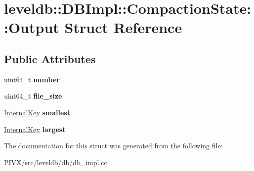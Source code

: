 \hypertarget{structleveldb_1_1_d_b_impl_1_1_compaction_state_1_1_output}{}\section{leveldb\+:\+:D\+B\+Impl\+:\+:Compaction\+State\+:\+:Output Struct Reference}
\label{structleveldb_1_1_d_b_impl_1_1_compaction_state_1_1_output}
\subsection*{Public Attributes}
\begin{DoxyCompactItemize}
\item 
\mbox{\label{structleveldb_1_1_d_b_impl_1_1_compaction_state_1_1_output_aa4b759dca2a83bdb8d9edbf7e2d213e2}} 
uint64\+\_\+t {\bfseries number}
\item 
\mbox{\label{structleveldb_1_1_d_b_impl_1_1_compaction_state_1_1_output_a37906cee65a9d1873b7b7a4169f22402}} 
uint64\+\_\+t {\bfseries file\+\_\+size}
\item 
\mbox{\label{structleveldb_1_1_d_b_impl_1_1_compaction_state_1_1_output_a88ada857d0cf32ae8e76d7baf4e80c69}} 
\mbox{\hyperlink{classleveldb_1_1_internal_key}{Internal\+Key}} {\bfseries smallest}
\item 
\mbox{\label{structleveldb_1_1_d_b_impl_1_1_compaction_state_1_1_output_a6e257f231aba82d20cb7199a552b2a63}} 
\mbox{\hyperlink{classleveldb_1_1_internal_key}{Internal\+Key}} {\bfseries largest}
\end{DoxyCompactItemize}


The documentation for this struct was generated from the following file\+:\begin{DoxyCompactItemize}
\item 
P\+I\+V\+X/src/leveldb/db/db\+\_\+impl.\+cc\end{DoxyCompactItemize}
